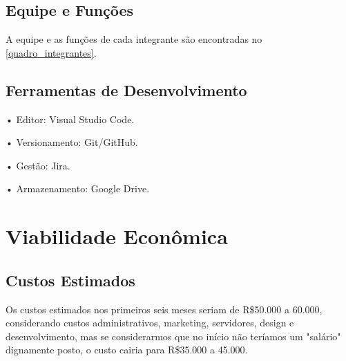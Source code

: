 \subsection*{Equipe e Funções}
A equipe e as funções de cada integrante são encontradas no \autoref{quadro_integrantes}.

\subsection*{Ferramentas de Desenvolvimento}
• Editor: Visual Studio Code.

• Versionamento: Git/GitHub.

• Gestão: Jira.

• Armazenamento: Google Drive.

\section{Viabilidade Econômica}

\subsection*{Custos Estimados}
Os custos estimados nos primeiros seis meses seriam de R\$50.000 a 60.000, considerando custos administrativos, marketing, servidores, design e desenvolvimento, mas se considerarmos que no início não teríamos um "salário" dignamente posto, o custo cairia para R\$35.000 a 45.000. 

\newpage